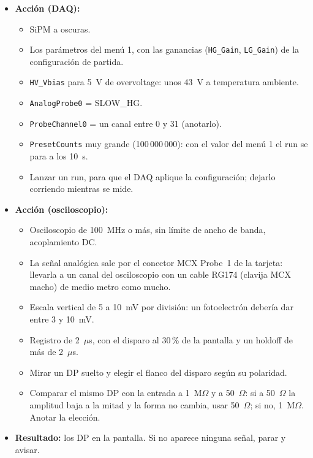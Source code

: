 \documentclass[11pt,a4paper]{article}
\begin{document}
\begin{itemize}
\item {\bf Acción (DAQ):}
  \begin{itemize}
  \item SiPM a oscuras.
  \item Los parámetros del menú 1, con las ganancias (\texttt{HG\_Gain},
    \texttt{LG\_Gain}) de la configuración de partida.
  \item \texttt{HV\_Vbias} para 5~V de overvoltage: unos 43~V a temperatura
    ambiente.
  \item \texttt{AnalogProbe0} = SLOW\_HG.
  \item \texttt{ProbeChannel0} = un canal entre 0 y 31 (anotarlo).
  \item \texttt{PresetCounts} muy grande (100\,000\,000): con el valor del
    menú 1 el run se para a los 10~s.
  \item Lanzar un run, para que el DAQ aplique la configuración; dejarlo
    corriendo mientras se mide.
  \end{itemize}
\item {\bf Acción (osciloscopio):}
  \begin{itemize}
  \item Osciloscopio de 100~MHz o más, sin límite de ancho de banda,
    acoplamiento DC.
  \item La señal analógica sale por el conector MCX Probe~1 de la tarjeta:
    llevarla a un canal del osciloscopio con un cable RG174 (clavija MCX
    macho) de medio metro como mucho.
  \item Escala vertical de 5 a 10~mV por división: un fotoelectrón debería
    dar entre 3 y 10~mV.
  \item Registro de 2~$\mu$s, con el disparo al 30\,\% de la pantalla y un
    holdoff de más de 2~$\mu$s.
  \item Mirar un DP suelto y elegir el flanco del disparo según su
    polaridad.
  \item Comparar el mismo DP con la entrada a 1~M$\Omega$ y a 50~$\Omega$:
    si a 50~$\Omega$ la amplitud baja a la mitad y la forma no cambia, usar
    50~$\Omega$; si no, 1~M$\Omega$. Anotar la elección.
  \end{itemize}
\item {\bf Resultado:} los DP en la pantalla. Si no aparece ninguna señal,
  parar y avisar.
\end{itemize}
\end{document}
